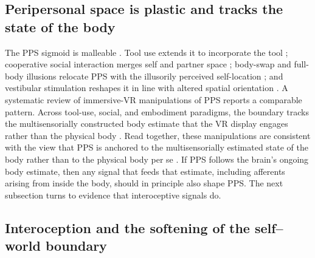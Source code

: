 \subsection{Peripersonal space is plastic and tracks the state of the body}


The PPS sigmoid is malleable \citep{Serino2019, Bufacchi2018, noel_2021, karakoc_2025}. Tool use extends it to incorporate the tool \citep{iriki1996coding, maravita2004tools}; cooperative social interaction merges self and partner space \citep{teneggi2013social}; body-swap and full-body illusions relocate PPS with the illusorily perceived self-location \citep{noel2015peripersonal, noel2015fullbody}; and vestibular stimulation reshapes it in line with altered spatial orientation \citep{pfeiffer2018vestibular}. A systematic review of immersive-VR manipulations of PPS reports a comparable pattern. Across tool-use, social, and embodiment paradigms, the boundary tracks the multisensorially constructed body estimate that the VR display engages rather than the physical body \citep{karakoc_2025}. Read together, these manipulations are consistent with the view that PPS is anchored to the multisensorially estimated state of the body rather than to the physical body per se \citep{blanke2015behavioral, Grivaz2017, serino2015bodypart, noel_2021}. If PPS follows the brain's ongoing body estimate, then any signal that feeds that estimate, including afferents arising from inside the body, should in principle also shape PPS. The next subsection turns to evidence that interoceptive signals do.

\subsection{Interoception and the softening of the self--world boundary}

